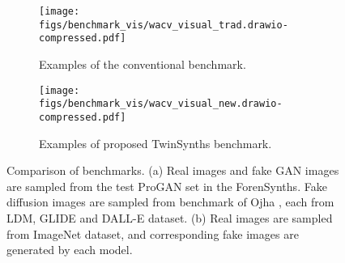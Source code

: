 \begin{figure*}[t]
    \centering
    \begin{subfigure}[t]{0.45\linewidth}
        \centering
        \texttt{[image: figs/benchmark\_vis/wacv\_visual\_trad.drawio-compressed.pdf]}
        \caption{Examples of the conventional benchmark.}
        \label{fig:benchmark_visual_trad}
    \end{subfigure}
    \begin{subfigure}[t]{0.45\linewidth}
        \centering
        \texttt{[image: figs/benchmark\_vis/wacv\_visual\_new.drawio-compressed.pdf]}
        \caption{Examples of proposed TwinSynths benchmark.}
        \label{fig:benchmark_visual_new}
    \end{subfigure}
    
    \caption{Comparison of benchmarks. (a) Real images and fake GAN images are sampled from the test ProGAN set in the ForenSynths\cite{wang2020cnn}. Fake diffusion images are sampled from benchmark of Ojha \etal\cite{ojha2023towards}, each from LDM, GLIDE and DALL-E dataset. (b) Real images are sampled from ImageNet dataset, and corresponding fake images are generated by each model.}
    \label{fig:benchmark_visual}
\end{figure*}